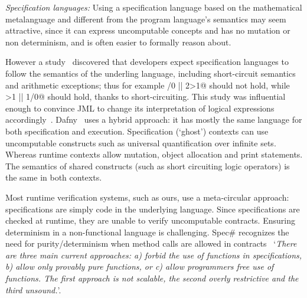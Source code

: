 


\textit{Specification languages:}
Using a specification language based on the mathematical metalanguage and different from the program language's semantics may seem attractive, since it can express uncomputable concepts and has no mutation or non determinism, and is often easier to formally reason about.

However a study~\cite{chalin2007logical} discovered that developers expect specification languages to follow the semantics of the underling language, including short-circuit semantics and arithmetic exceptions; thus for example /0 || 2>1@ should not hold, while >1 || 1/0@ should hold, thanks to short-circuiting.
This study was influential enough to convince JML to change its interpretation of logical expressions
accordingly~\cite{chalin2008jml}.
Dafny~\cite{DBLP:conf/sigada/Leino12} uses a hybrid approach: it has mostly the same language for both specification and execution. Specification (`ghost') contexts can use uncomputable constructs such as universal quantification over infinite sets. Whereas runtime contexts allow mutation, object allocation and print statements. The semantics of shared constructs (such as short circuiting logic operators) is the same in both contexts.

Most runtime verification systems, such as ours, use a meta-circular approach: specifications are simply code in the underlying language. Since specifications are checked at runtime, they are unable to verify uncomputable contracts.
 Ensuring determinism in a non-functional language is challenging. Spec\# recognizes the need for purity/determinism when method calls are allowed in contracts~\cite{barnett200499} `\emph{There are three main current approaches: a) forbid the use of functions in specifications, b) allow only provably pure functions, or c) allow programmers free use
	of functions. The first approach is not scalable, the second overly restrictive and
	the third unsound.}'.

